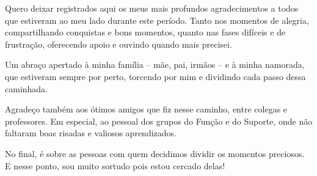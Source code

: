 \begin{agradecimentos}

Quero deixar registrados aqui os meus mais profundos agradecimentos a todos que estiveram ao meu lado durante este período.
Tanto nos momentos de alegria, compartilhando conquistas e bons momentos, quanto nas fases difíceis e de frustração, oferecendo apoio e ouvindo quando mais precisei.

Um abraço apertado à minha família -- mãe, pai, irmãos -- e à minha namorada, que estiveram sempre por perto, torcendo por mim e dividindo cada passo dessa caminhada.

Agradeço também aos ótimos amigos que fiz nesse caminho, entre colegas e professores.
Em especial, ao pessoal dos grupos do Função e do Suporte, onde não faltaram boas risadas e valiosos aprendizados.

No final, é sobre as pessoas com quem decidimos dividir os momentos preciosos.
E nesse ponto, sou muito sortudo pois estou cercado delas!

\end{agradecimentos}
